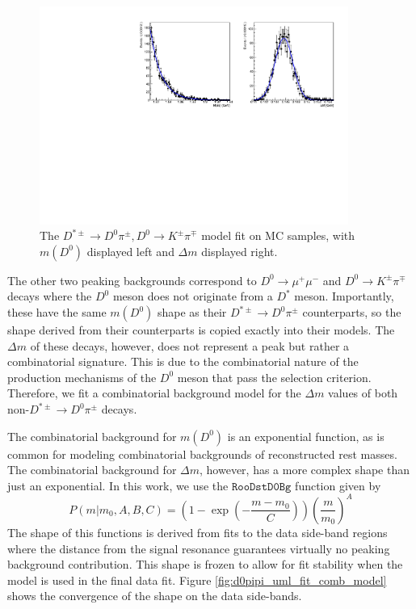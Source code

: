\begin{figure}[htp]
    \begin{center}
      \includegraphics[width=0.9\textwidth]{figures/chapter4/normalization_fit/dpipi_fit_mc_kpi.pdf}
    \end{center}
    \caption{
      The $D^{*\pm} \to D^0\pi^\pm, D^0 \to K^\pm \pi^\mp$ model fit on MC samples, with $m(D^0)$ displayed left and $\Delta m$ displayed right.
    }
    \label{fig:d0pipi_uml_fit_kpi_model}
\end{figure}

The other two peaking backgrounds correspond to $D^0 \to \mu^+ \mu^-$ and $D^0 \to K^\pm \pi^\mp$ decays where the $D^0$ meson does not originate from a $D^*$ meson. Importantly, these have the same $m(D^0)$ shape as their $D^{*\pm} \to D^0 \pi^\pm$ counterparts, so the shape derived from their counterparts is copied exactly into their models. The $\Delta m$ of these decays, however, does not represent a peak but rather a combinatorial signature. This is due to the combinatorial nature of the production mechanisms of the $D^0$ meson that pass the selection criterion. Therefore, we fit a combinatorial background model for the $\Delta m$ values of both non-$D^{*\pm} \to D^0 \pi^\pm$ decays. 

The combinatorial background for $m(D^0)$ is an exponential function, as is common for modeling combinatorial backgrounds of reconstructed rest masses. The combinatorial background for $\Delta m$, however, has a more complex shape than just an exponential. In this work, we use the $\texttt{RooDstD0Bg}$ function \cite{ref:verkerke2003roofit} given by
\begin{equation}
    P(m|m_0, A, B, C) = \left(1 - \exp \left(-\frac{m-m_0}{C} \right) \right) \left( \frac{m}{m_0}\right)^A
\end{equation}
The shape of this functions is derived from fits to the data side-band regions where the distance from the signal resonance guarantees virtually no peaking background contribution. This shape is frozen to allow for fit stability when the model is used in the final data fit. Figure \ref{fig:d0pipi_uml_fit_comb_model} shows the convergence of the shape on the data side-bands.

